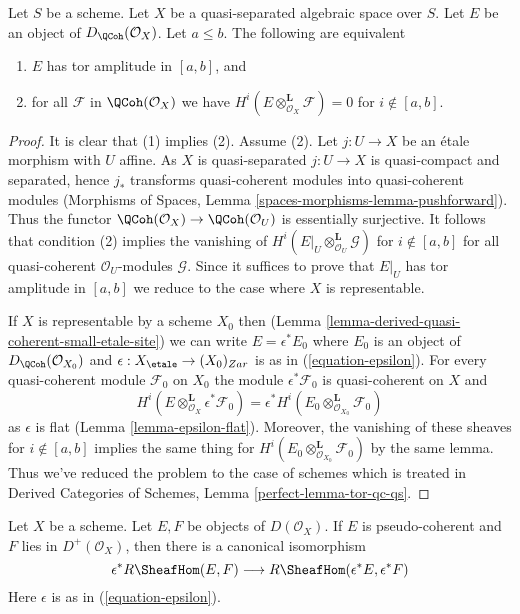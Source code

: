 \begin{lemma}
\label{lemma-tor-qc-qs}
Let $S$ be a scheme. Let $X$ be a quasi-separated algebraic space over $S$.
Let $E$ be an object of $D_\QCoh(\mathcal{O}_X)$. Let $a \leq b$.
The following are equivalent
\begin{enumerate}
\item $E$ has tor amplitude in $[a, b]$, and
\item for all $\mathcal{F}$ in $\QCoh(\mathcal{O}_X)$
we have $H^i(E \otimes_{\mathcal{O}_X}^\mathbf{L} \mathcal{F}) = 0$
for $i \not \in [a, b]$.
\end{enumerate}
\end{lemma}

\begin{proof}
It is clear that (1) implies (2). Assume (2). Let $j : U \to X$ be
an \'etale morphism with $U$ affine. As $X$ is quasi-separated $j : U \to X$
is quasi-compact and separated, hence $j_*$ transforms quasi-coherent
modules into quasi-coherent modules (Morphisms of Spaces, Lemma
\ref{spaces-morphisms-lemma-pushforward}).
Thus the functor
$\QCoh(\mathcal{O}_X) \to \QCoh(\mathcal{O}_U)$
is essentially surjective. It follows that condition (2)
implies the vanishing of
$H^i(E|_U \otimes_{\mathcal{O}_U}^\mathbf{L} \mathcal{G})$
for $i \not \in [a, b]$ for all quasi-coherent $\mathcal{O}_U$-modules
$\mathcal{G}$. Since it suffices to prove that $E|_U$ has tor amplitude
in $[a, b]$ we reduce to the case where $X$ is representable.

\medskip\noindent
If $X$ is representable by a scheme $X_0$ then
(Lemma \ref{lemma-derived-quasi-coherent-small-etale-site})
we can write $E = \epsilon^*E_0$ where $E_0$ is an object of
$D_\QCoh(\mathcal{O}_{X_0})$ and
$\epsilon : X_\etale \to (X_0)_{Zar}$ is as in
(\ref{equation-epsilon}). For every quasi-coherent module
$\mathcal{F}_0$ on $X_0$ the module $\epsilon^*\mathcal{F}_0$
is quasi-coherent on $X$ and
$$
H^i(E \otimes_{\mathcal{O}_X}^\mathbf{L} \epsilon^*\mathcal{F}_0)
=
\epsilon^*H^i(E_0 \otimes_{\mathcal{O}_{X_0}}^\mathbf{L} \mathcal{F}_0)
$$
as $\epsilon$ is flat (Lemma \ref{lemma-epsilon-flat}).
Moreover, the vanishing of these sheaves for $i \not \in [a, b]$
implies the same thing for
$H^i(E_0 \otimes_{\mathcal{O}_{X_0}}^\mathbf{L} \mathcal{F}_0)$
by the same lemma. Thus we've reduced the problem to the case
of schemes which is treated in
Derived Categories of Schemes, Lemma \ref{perfect-lemma-tor-qc-qs}.
\end{proof}

\begin{lemma}
\label{lemma-descend-RHom}
Let $X$ be a scheme. Let $E, F$ be objects of $D(\mathcal{O}_X)$.
If $E$ is pseudo-coherent and $F$ lies in $D^+(\mathcal{O}_X)$, then
there is a canonical isomorphism
$$
\epsilon^*R\SheafHom(E, F) \longrightarrow R\SheafHom(\epsilon^*E, \epsilon^*F)
$$
Here $\epsilon$ is as in (\ref{equation-epsilon}).
\end{lemma}

